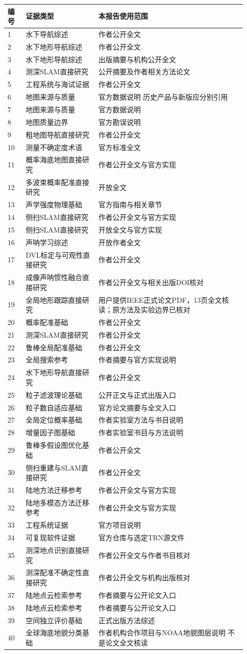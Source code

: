 \begin{longtable}[]{@{}p{0.07\linewidth}p{0.29\linewidth}p{0.58\linewidth}@{}}
\toprule
编号 & 证据类型 & 本报告使用范围\tabularnewline
\midrule
\endhead
1 & 水下导航综述 & 作者公开全文\tabularnewline
2 & 水下地形导航综述 & 作者公开全文\tabularnewline
3 & 水下地形导航综述 & 出版摘要与机构公开全文\tabularnewline
4 & 测深SLAM直接研究 & 公开摘要及作者相关方法论文\tabularnewline
5 & 工程系统与海试证据 & 作者公开全文\tabularnewline
6 & 地图来源与质量 & 官方数据说明 历史产品与新版应分别引用\tabularnewline
7 & 地图来源与质量 & 官方数据说明\tabularnewline
8 & 地图质量边界 & 官方勘误说明\tabularnewline
9 & 粗地图导航直接研究 & 作者公开全文\tabularnewline
10 & 测量不确定度术语 & 官方标准全文\tabularnewline
11 & 概率海底地图直接研究 & 作者公开全文与官方实现\tabularnewline
12 & 多波束概率配准直接研究 & 开放全文\tabularnewline
13 & 声学强度物理基础 & 官方指南与相关章节\tabularnewline
14 & 侧扫SLAM直接研究 & 作者公开全文与官方实现\tabularnewline
15 & 侧扫SLAM直接研究 & 开放全文与官方实现\tabularnewline
16 & 声呐学习综述 & 开放作者全文\tabularnewline
17 & DVL标定与可观性直接研究 & 作者公开全文\tabularnewline
18 & 成像声呐惯性融合直接研究 & 作者公开全文与相关出版DOI核对\tabularnewline
19 & 全局地形跟踪直接研究 & 用户提供IEEE正式论文PDF，13页全文核读；原方法及实验边界已核对\tabularnewline
20 & 概率配准基础 & 作者公开全文\tabularnewline
21 & 测深SLAM直接研究 & 作者公开全文\tabularnewline
22 & 鲁棒全局配准基础 & 作者公开全文\tabularnewline
23 & 全局搜索参考 & 作者摘要与官方实现说明\tabularnewline
24 & 水下地形导航直接研究 & 作者公开全文\tabularnewline
25 & 粒子滤波理论基础 & 公开正文与正式出版入口\tabularnewline
26 & 粒子数自适应基础 & 官方论文摘要与全文入口\tabularnewline
27 & 全局定位概率基础 & 作者实验室方法与书目说明\tabularnewline
28 & 增量因子图基础 & 作者实验室书目与方法说明\tabularnewline
29 & 鲁棒多假设图优化基础 & 作者公开全文\tabularnewline
30 & 侧扫重建与SLAM直接研究 & 作者公开全文\tabularnewline
31 & 陆地方法迁移参考 & 作者公开全文与官方实现\tabularnewline
32 & 陆地多模态方法迁移参考 & 作者公开全文与官方实现\tabularnewline
33 & 工程系统证据 & 官方项目说明\tabularnewline
34 & 可复现软件证据 & 官方仓库与选定TRN源文件\tabularnewline
35 & 测深地点识别直接研究 & 作者公开全文与作者书目核对\tabularnewline
36 & 测深配准不确定性直接研究 & 作者公开全文与机构出版核对\tabularnewline
37 & 陆地点云检索参考 & 作者摘要与公开论文入口\tabularnewline
38 & 陆地点云检索参考 & 作者摘要与公开论文入口\tabularnewline
39 & 空间独立评价基础 & 正式出版方法综述\tabularnewline
40 & 全球海底地貌分类基础 & 作者机构合作项目与NOAA地貌图层说明 不是论文全文核读\tabularnewline

\end{longtable}

